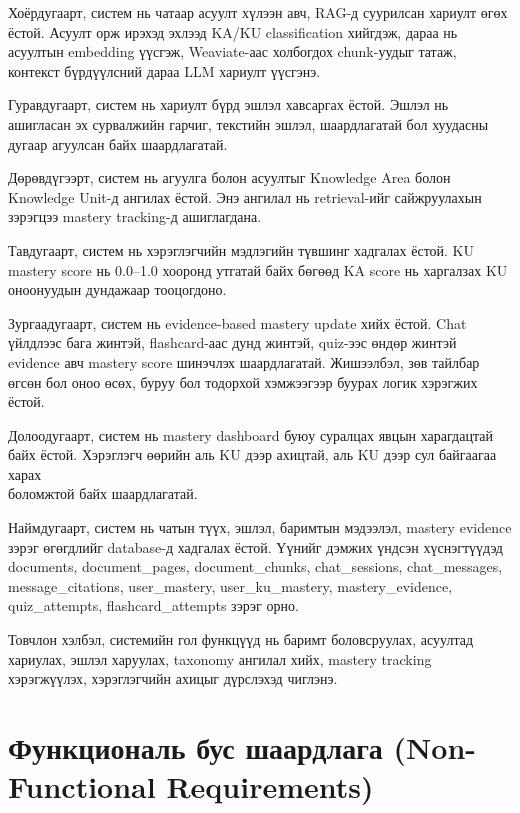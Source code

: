 \documentclass[12pt,A4]{report}
\newcommand{\eng}[1]{#1}
\begin{document}
Хоёрдугаарт, систем нь чатаар асуулт хүлээн авч, \eng{RAG}-д суурилсан хариулт өгөх ёстой. Асуулт орж ирэхэд эхлээд \eng{KA/KU classification} хийгдэж, дараа нь асуултын \eng{embedding} үүсгэж, \eng{Weaviate}-аас холбогдох \eng{chunk}-уудыг татаж, контекст бүрдүүлсний дараа \eng{LLM} хариулт үүсгэнэ.

Гуравдугаарт, систем нь хариулт бүрд эшлэл хавсаргах ёстой. Эшлэл нь ашигласан эх сурвалжийн гарчиг, текстийн эшлэл, шаардлагатай бол хуудасны дугаар агуулсан байх шаардлагатай. 

Дөрөвдүгээрт, систем нь агуулга болон асуултыг \eng{Knowledge Area} болон \eng{Knowledge Unit}-д ангилах ёстой. Энэ ангилал нь retrieval-ийг сайжруулахын зэрэгцээ mastery tracking-д ашиглагдана. 

Тавдугаарт, систем нь хэрэглэгчийн мэдлэгийн түвшинг хадгалах ёстой. \eng{KU mastery score} нь 0.0--1.0 хооронд утгатай байх бөгөөд \eng{KA score} нь харгалзах \eng{KU} оноонуудын дундажаар тооцогдоно. 

Зургаадугаарт, систем нь \eng{evidence-based mastery update} хийх ёстой. \eng{Chat} үйлдлээс бага жинтэй, \eng{flashcard}-аас дунд жинтэй, \eng{quiz}-ээс өндөр жинтэй \eng{evidence} авч mastery score шинэчлэх шаардлагатай. Жишээлбэл, зөв тайлбар өгсөн бол оноо өсөх, буруу бол тодорхой хэмжээгээр буурах логик хэрэгжих ёстой.

Долоодугаарт, систем нь \eng{mastery dashboard} буюу суралцах явцын харагдацтай байх ёстой. Хэрэглэгч өөрийн аль \eng{KU} дээр ахицтай, аль \eng{KU} дээр сул байгаагаа харах \\боломжтой байх шаардлагатай.

Наймдугаарт, систем нь чатын түүх, эшлэл, баримтын мэдээлэл, mastery evidence зэрэг өгөгдлийг \eng{database}-д хадгалах ёстой. Үүнийг дэмжих үндсэн хүснэгтүүдэд \eng{documents}, \eng{document\_pages}, \eng{document\_chunks}, \eng{chat\_sessions}, \eng{chat\_messages}, \eng{message\_citations}, \eng{user\_mastery}, \eng{user\_ku\_mastery}, \eng{mastery\_evidence}, \eng{quiz\_attempts}, \eng{flashcard\_attempts} зэрэг орно.

Товчлон хэлбэл, системийн гол функцүүд нь баримт боловсруулах, асуултад хариулах, эшлэл харуулах, taxonomy ангилал хийх, mastery tracking хэрэгжүүлэх, хэрэглэгчийн ахицыг дүрслэхэд чиглэнэ.

\section{Функциональ бус шаардлага (Non-Functional Requirements)}
\end{document}
